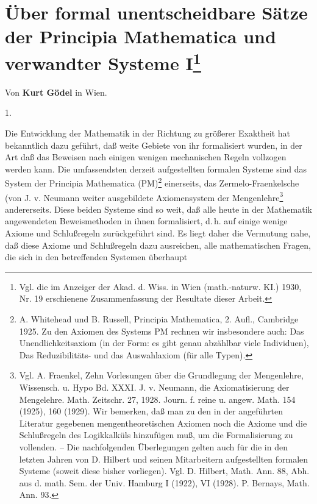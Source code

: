 \documentclass{scrartcl}
\begin{document}
\section{Über formal unentscheidbare Sätze der Principia Mathematica und verwandter Systeme I\protect\footnote{Vgl. die im Anzeiger der Akad. d. Wiss. in Wien (math.-naturw. KI.) 1930, Nr. 19 erschienene Zusammenfassung der Resultate dieser Arbeit.}}

\begin{center}
Von \textbf{Kurt Gödel} in Wien.
\end{center}

\begin{center}
1.
\end{center}

Die Entwicklung der Mathematik in der Richtung zu größerer
Exaktheit hat bekanntlich dazu geführt, daß weite Gebiete
von ihr formalisiert wurden, in der Art daß das Beweisen
nach einigen wenigen mechanischen Regeln vollzogen werden
kann. Die umfassendsten derzeit aufgestellten formalen 
Systeme sind das System der Principia Mathematica 
(PM)\footnote{A. Whitehead und B. Russell, Principia
Mathematica, 2. Aufl., Cambridge 1925. Zu den Axiomen 
des Systems PM rechnen wir insbesondere auch: 
Das Unendlichkeitsaxiom (in der Form: es gibt 
genau abzählbar viele Individuen), 
Das Reduzibilitäts- und das Auswahlaxiom (für alle 
Typen).} einerseits, das Zermelo-Fraenkelsche
(von J. v. Neumann weiter ausgebildete Axiomensystem
der Mengenlehre\footnote{Vgl. A. Fraenkel, Zehn
Vorlesungen über die Grundlegung der Mengenlehre,
Wissensch. u. Hypo Bd. XXXI. J. v. Neumann, die
Axiomatisierung der Mengelehre. Math. Zeitschr. 27, 
1928. Journ. f. reine u. angew. Math. 154 (1925), 
160 (1929). Wir bemerken, daß man zu den in der
angeführten Literatur gegebenen mengentheoretischen
Axiomen noch die Axiome und die Schlußregeln des
Logikkalküls hinzufügen muß, um die Formalisierung 
zu vollenden. -- Die nachfolgenden Überlegungen gelten
auch für die in den letzten Jahren von D. Hilbert und
seinen Mitarbeitern aufgestellten formalen Systeme 
(soweit diese bisher vorliegen). Vgl. D. Hilbert,
Math. Ann. 88, Abh. aus d. math. Sem. der Univ. 
Hamburg I (1922), VI (1928). P. Bernays, Math. Ann. 93.} 
andererseits. Diese beiden Systeme sind so weit, daß 
alle heute in der Mathematik angewendeten 
Beweismethoden in ihnen formalisiert, d.\,h. auf
einige wenige Axiome und Schlußregeln zurückgeführt sind.
Es liegt daher die Vermutung nahe, daß diese Axiome
und Schlußregeln dazu ausreichen, alle mathematischen
Fragen, die sich in den betreffenden Systemen überhaupt
\end{document}
